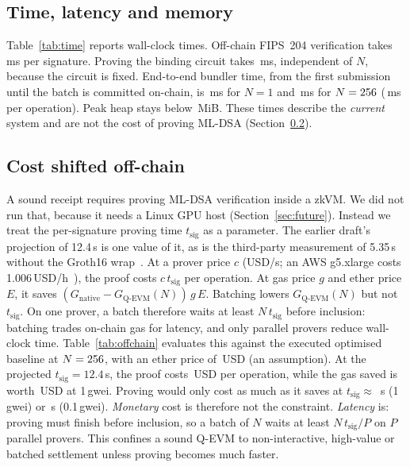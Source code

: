 \documentclass[conference]{IEEEtran}
\begin{document}
\subsection{Time, latency and memory}
Table~\ref{tab:time} reports wall-clock times. Off-chain FIPS~204 verification takes \MldsaVerifyMsPerOp\,ms per signature. Proving the binding circuit takes \ProveMsOne\,ms, independent of $N$, because the circuit is fixed. End-to-end bundler time, from the first submission until the batch is committed on-chain, is \EtoEMsOne\,ms for $N=1$ and \EtoEMsMax\,ms for $N=256$ (\EtoEPerOpMax\,ms per operation). Peak heap stays below \HeapMax\,MiB. These times describe the \emph{current} system and are not the cost of proving ML-DSA (Section~\ref{sec:offchain}).

\begin{table}[t]
\centering
\caption{Off-chain time and memory (mean of \Repeats\ runs; laptop, see Appendix). ``Authorise'' is Groth16 proving of the binding circuit (A2/A3) or ECDSA signing (A1).}\label{tab:time}
\small

\end{table}

\subsection{Cost shifted off-chain}\label{sec:offchain}
A sound receipt requires proving ML-DSA verification inside a zkVM. We did not run that, because it needs a Linux GPU host (Section~\ref{sec:future}). Instead we treat the per-signature proving time $t_{\mathrm{sig}}$ as a parameter. The earlier draft's projection of 12.4\,s is one value of it, as is the third-party measurement of 5.35\,s without the Groth16 wrap~\cite{kaspakii2026pqzkbench}. At a prover price $c$ (USD/s; an AWS g5.xlarge costs 1.006\,USD/h~\cite{aws2026g5pricing}), the proof costs $c\,t_{\mathrm{sig}}$ per operation. At gas price $g$ and ether price $E$, it saves $(G_{\mathrm{native}}-G_{\mathrm{Q\text{-}EVM}}(N))\,g\,E$. Batching lowers $G_{\mathrm{Q\text{-}EVM}}(N)$ but not $t_{\mathrm{sig}}$. On one prover, a batch therefore waits at least $N\,t_{\mathrm{sig}}$ before inclusion: batching trades on-chain gas for latency, and only parallel provers reduce wall-clock time. Table~\ref{tab:offchain} evaluates this against the executed optimised baseline at $N=256$, with an ether price of \EthUsd\,USD (an assumption). At the projected $t_{\mathrm{sig}}=12.4$\,s, the proof costs \ProverUsdPerOpProj\,USD per operation, while the gas saved is worth \SavedUsdOneGwei\,USD at 1\,gwei. Proving would only cost as much as it saves at $t_{\mathrm{sig}}\approx$ \BreakEvenOneGwei\,s (1\,gwei) or \BreakEvenTenthGwei\,s (0.1\,gwei). \emph{Monetary} cost is therefore not the constraint. \emph{Latency} is: proving must finish before inclusion, so a batch of $N$ waits at least $N\,t_{\mathrm{sig}}/P$ on $P$ parallel provers. This confines a sound Q-EVM to non-interactive, high-value or batched settlement unless proving becomes much faster.
\end{document}
